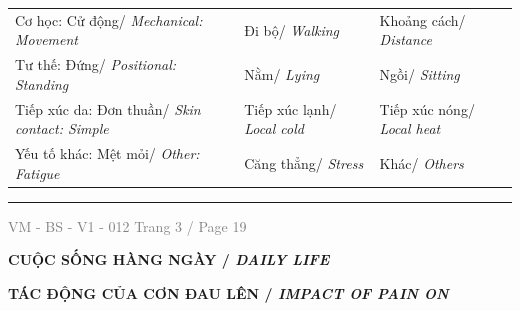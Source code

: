 \documentclass[11pt,a4paper]{article}
\newcommand{\CheckBox}[2][false]{%
    \ifthenelse{\equal{#1}{true}}{%
        \makebox[0pt][l]{$\square$}\raisebox{.15ex}{\hspace{0.08em}$\checkmark$}%
    }{%
        $\square$%
    }%
    \hspace{0.12cm}#2%
}
\newcommand{\SectionTitle}[2]{%
    \vspace{0.12cm}
    {\bfseries\large #1/ \textit{#2}}\par
    \vspace{0.06cm}
}
\newcommand{\SubSectionTitle}[2]{%
    \vspace{0.08cm}
    {\bfseries #1/ \textit{#2}}\par
}
\newcommand{\FormFooter}[2]{%
    \vfill
    \hrule
    \vspace{0.08cm}
    \noindent
    \small \textcolor{gray}{VM - BS - V1 - 012} \hfill \small \textcolor{gray}{Trang #1 / Page #2}
}
\begin{document}
\begin{tabularx}{\textwidth}{@{} X X X @{}}
    \CheckBox[true]{ Cơ học: Cử động/ \textit{ Mechanical: Movement } }  &     \CheckBox[false]{ Đi bộ/ \textit{ Walking } }  &     \CheckBox[false]{ Khoảng cách/ \textit{ Distance } }   \\[0.12cm]
    \CheckBox[false]{ Tư thế: Đứng/ \textit{ Positional: Standing } }  &     \CheckBox[true]{ Nằm/ \textit{ Lying } }  &     \CheckBox[false]{ Ngồi/ \textit{ Sitting } }   \\[0.12cm]
    \CheckBox[false]{ Tiếp xúc da: Đơn thuần/ \textit{ Skin contact: Simple } }  &     \CheckBox[true]{ Tiếp xúc lạnh/ \textit{ Local cold } }  &     \CheckBox[false]{ Tiếp xúc nóng/ \textit{ Local heat } }   \\[0.12cm]
    \CheckBox[false]{ Yếu tố khác: Mệt mỏi/ \textit{ Other: Fatigue } }  &     \CheckBox[false]{ Căng thẳng/ \textit{ Stress } }  &     \CheckBox[false]{ Khác/ \textit{ Others } }   \\[0.12cm]
\end{tabularx}

\FormFooter{ 3 }{ 19 }
\newpage

\SectionTitle{ CUỘC SỐNG HÀNG NGÀY }{ DAILY LIFE }

\SubSectionTitle{ TÁC ĐỘNG CỦA CƠN ĐAU LÊN }{ IMPACT OF PAIN ON }
\end{document}
